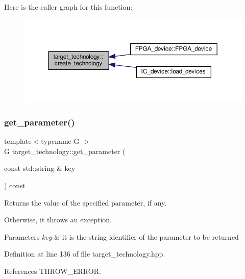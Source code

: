 Here is the caller graph for this function\+:
\nopagebreak
\begin{figure}[H]
\begin{center}
\leavevmode
\includegraphics[width=350pt]{d8/d05/classtarget__technology_ad1a3a587984c7728ee7999f58a56c21a_icgraph}
\end{center}
\end{figure}
\mbox{\label{classtarget__technology_a92e316c35a7954c97093afe27e333e0b}} 
\subsubsection{\texorpdfstring{get\+\_\+parameter()}{get\_parameter()}}
{\footnotesize\ttfamily template$<$typename G $>$ \\
G target\+\_\+technology\+::get\+\_\+parameter (\begin{DoxyParamCaption}\item[{const std\+::string \&}]{key }\end{DoxyParamCaption}) const\hspace{0.3cm}{\ttfamily [inline]}}



Returns the value of the specified parameter, if any. 

Otherwise, it throws an exception. 
\begin{DoxyParams}{Parameters}
{\em key} & it is the string identifier of the parameter to be returned \\
\hline
\end{DoxyParams}


Definition at line 136 of file target\+\_\+technology.\+hpp.



References T\+H\+R\+O\+W\+\_\+\+E\+R\+R\+OR.



